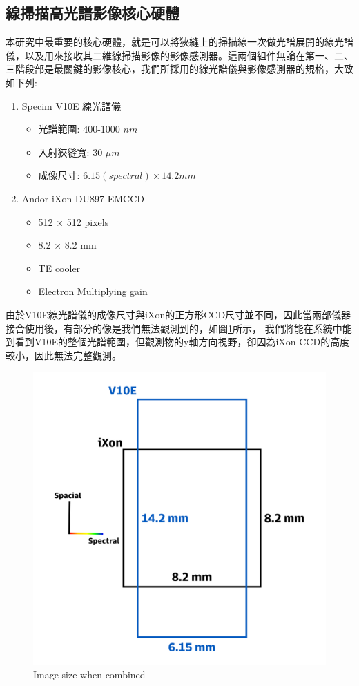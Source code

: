 \documentclass[12pt]{article}
\begin{document}
\subsection{線掃描高光譜影像核心硬體}
本研究中最重要的核心硬體，就是可以將狹縫上的掃描線一次做光譜展開的線光譜儀，以及用來接收其二維線掃描影像的影像感測器。這兩個組件無論在第一、二、三階段部是最關鍵的影像核心，我們所採用的線光譜儀與影像感測器的規格，大致如下列:
\begin{enumerate}
    \item Specim V10E 線光譜儀
          \begin{itemize}
              \item 光譜範圍: 400-1000 $nm$
              \item 入射狹縫寬: 30 $\mu m$
              \item 成像尺寸: $6.15(spectral) \times 14.2 mm$
          \end{itemize}
    \item Andor iXon DU897 EMCCD
          \begin{itemize}
              \item 512 $\times$ 512 pixels
              \item 8.2 $\times$ 8.2 mm
              \item TE cooler
              \item Electron Multiplying gain
          \end{itemize}
\end{enumerate}
由於V10E線光譜儀的成像尺寸與iXon的正方形CCD尺寸並不同，因此當兩部儀器接合使用後，有部分的像是我們無法觀測到的，如圖\ref{figure: image size}所示，
我們將能在系統中能到看到V10E的整個光譜範圍，但觀測物的y軸方向視野，卻因為iXon CCD的高度較小，因此無法完整觀測。

\begin{figure}[h]
    \centering
    \includegraphics[width=0.5\linewidth]{imagesize.jpg}
    \caption{Image size when combined}
    \label{figure: image size}
\end{figure}
\end{document}
